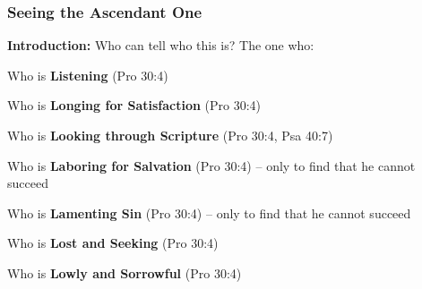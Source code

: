 \subsubsection{Seeing the Ascendant One}
\textbf{Introduction:} Who can tell who this is? The one who:\
\begin{compactenum}[I.][7]
    \item Who is \textbf{Listening} (Pro 30:4)
    \item Who is \textbf{Longing for Satisfaction} (Pro 30:4)
    \item Who is \textbf{Looking through Scripture} (Pro 30:4, Psa 40:7)
    \item Who is \textbf{Laboring for Salvation} (Pro 30:4) -- only to find that he cannot succeed
    \item Who is \textbf{Lamenting Sin} (Pro 30:4) -- only to find that he cannot succeed
    \item Who is \textbf{Lost and Seeking} (Pro 30:4) 
    \item Who is \textbf{Lowly and Sorrowful} \index[scripture]{Proverbs!Pro 30:04}(Pro 30:4) 
\end{compactenum}


